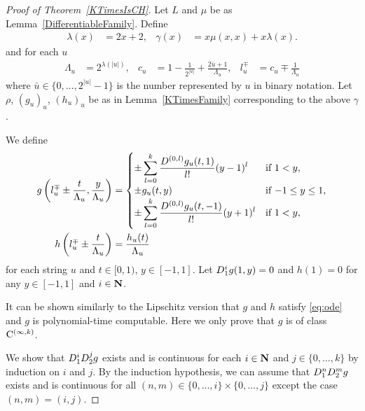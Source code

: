 \begin{proof}[Proof of Theorem~\ref{KTimesIsCH}]
Let $L$ and $\mu$ be as Lemma~\ref{DifferentiableFamily}.
Define
 \begin{align}
  \lambda(x) &= 2x + 2,&
  \gamma(x) &= x \mu(x, x) + x \lambda(x).
 \end{align}
and for each $u$
\begin{align}
 \Lambda_u 
 &= 2^{\lambda(|u|)}, &
 c_u 
 &= 1-\frac{1}{2^{|u|}}+\frac{2\bar{u}+1}{\Lambda_u}, &
 l_u^\mp 
 &= c_u\mp\frac{1}{\Lambda_u}
\end{align}  
 where $\bar u \in \{0, \dots, 2^{|u|} - 1\}$ is the number represented by $u$ in binary notation.
Let $\rho$, $(g_u)_u$, $(h_u)_u$ be as in Lemma~\ref{KTimesFamily} 
corresponding to the above $\gamma$.

We define
 \begin{align} \label{eq:g}
 g \left(l^\mp_u \pm \frac{t}{\Lambda_u}, \frac{y}{\Lambda_u}\right)
  &= \begin{cases}
      \pm \displaystyle \sum_{l=0}^k \frac{D^{(0,l)}g_u(t,1)}{l!} (y-1)^l 
      &  \text{if} \ 1<y, \\
      \pm g_u(t, y)      & \text{if} \ {-1} \le y \le 1, \\
      \pm \displaystyle \sum_{l=0}^k \frac{D^{(0,l)}g_u(t,-1)}{l!} (y+1)^l  
      &  \text{if} \ 1<y, \\
    \end{cases} 
  \\
 h \left( l^\mp_u \pm \frac{t}{\Lambda_u} \right) 
  & = \frac{h_u(t)}{\Lambda_u}
\end{align}
for each string $u$ and $t \in [0,1)$, $y \in [-1, 1]$.
Let $D_1^i g(1,y) = 0$ and $h(1) = 0$ for any $y \in [-1,1]$ and $i \in \mathbf N$.

It can be shown similarly to the Lipschitz version 
\cite[Theorem 3.2]{kawamura2010lipschitz}
that $g$ and $h$ satisfy \eqref{eq:ode} and $g$ is polynomial-time computable.
Here we only prove that $g$ is of class $\mathrm C^{(\infty, k)}$.

We show that $D_1^i D_2^j g$ exists and is continuous 
for each $i \in \mathbf N$ and $j \in \{0, \dots, k\}$ by induction on $i$ and $j$.
By the induction hypothesis, we can assume that $D_1^n D_2^m g$ exists and is continuous 
for all $(n, m) \in \{0, \dots, i\} \times \{0, \dots, j\}$ 
except the case $(n, m) = (i, j)$.



\end{proof}

